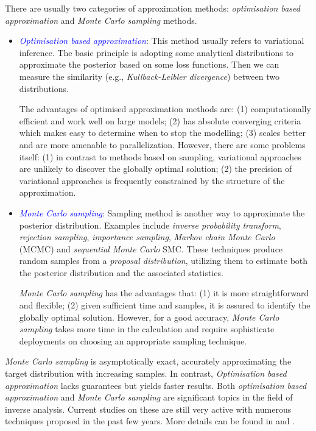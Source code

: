 There are usually two categories of approximation methods: \textit{optimisation based approximation} and \textit{Monte Carlo sampling} methods.
\begin{itemize}[left=0pt]
    \item \textcolor{blue}{\textit{Optimisation based approximation}}: This method usually refers to variational inference. The basic principle is adopting some analytical distributions to approximate the posterior based on some loss functions. Then we can measure the similarity (e.g., \textit{Kullback-Leibler divergence}) between two distributions.

The advantages of optimised approximation methods are: (1) computationally efficient and work well on large models; (2) has absolute converging criteria which makes easy to determine when to stop the modelling; (3) scales better and are more amenable to parallelization. However, there are some problems itself: (1) in contrast to methods based on sampling, variational approaches are unlikely to discover the globally optimal solution; (2) the precision of variational approaches is frequently constrained by the structure of the approximation.
    \item \textcolor{blue}{\textit{Monte Carlo sampling}}: Sampling method is another way to approximate the posterior distribution. Examples include \textit{inverse probability transform}, \textit{rejection sampling}, \textit{importance sampling}, \textit{Markov chain Monte Carlo} (\acrshort{MCMC}) and \textit{sequential Monte Carlo} \acrshort{SMC}. These techniques produce random samples from a \textit{proposal distribution}, utilizing them to estimate both the posterior distribution and the associated statistics.

  \textit{Monte Carlo sampling} has the advantages that: (1) it is more straightforward and flexible; (2) given sufficient time and samples, it is assured to identify the globally optimal solution. However, for a good accuracy, \textit{Monte Carlo sampling} takes more time in the calculation and require sophisticate deployments on choosing an appropriate sampling technique. 
\end{itemize}

\textit{Monte Carlo sampling} is asymptotically exact, accurately approximating the target distribution with increasing samples. In contrast, \textit{Optimisation based approximation} lacks guarantees but yields faster results. Both \textit{optimisation based approximation} and \textit{Monte Carlo sampling} are significant topics in the field of inverse analysis. Current studies on these are still very active with numerous techniques proposed in the past few years. More details can be found in \cite{murphy2012} and \cite{blei2017}.

